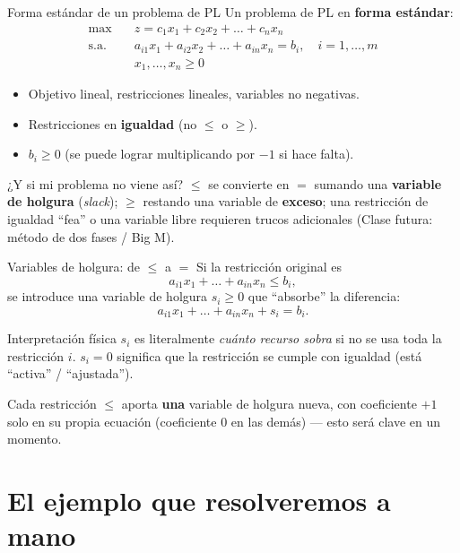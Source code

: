 \documentclass[aspectratio=169]{beamer}
\begin{document}
\begin{frame}{Forma estándar de un problema de PL}
Un problema de PL en \textbf{forma estándar}:
\[
\begin{aligned}
\max \quad & z = c_1 x_1 + c_2 x_2 + \dots + c_n x_n \\
\text{s.a.} \quad & a_{i1}x_1 + a_{i2}x_2 + \dots + a_{in}x_n = b_i, \quad i=1,\dots,m \\
& x_1,\dots,x_n \geq 0
\end{aligned}
\]

\begin{itemize}
\item Objetivo lineal, restricciones lineales, variables no negativas.
\item Restricciones en \textbf{igualdad} (no $\leq$ o $\geq$).
\item $b_i \geq 0$ (se puede lograr multiplicando por $-1$ si hace falta).
\end{itemize}
\par\medskip
\begin{block}{¿Y si mi problema no viene así?}
$\leq$ se convierte en $=$ sumando una \textbf{variable de holgura} (\emph{slack}); $\geq$ restando una variable de \textbf{exceso}; una restricción de igualdad ``fea'' o una variable libre requieren trucos adicionales (Clase futura: método de dos fases / Big M).
\end{block}
\end{frame}

\begin{frame}{Variables de holgura: de $\leq$ a $=$}
Si la restricción original es
\[
a_{i1}x_1 + \dots + a_{in}x_n \leq b_i,
\]
se introduce una variable de holgura $s_i \geq 0$ que ``absorbe'' la diferencia:
\[
a_{i1}x_1 + \dots + a_{in}x_n + s_i = b_i.
\]
\par\medskip
\begin{exampleblock}{Interpretación física}
$s_i$ es literalmente \emph{cuánto recurso sobra} si no se usa toda la restricción $i$. $s_i=0$ significa que la restricción se cumple con igualdad (está ``activa'' / ``ajustada'').
\end{exampleblock}

Cada restricción $\leq$ aporta \textbf{una} variable de holgura nueva, con coeficiente $+1$ solo en su propia ecuación (coeficiente $0$ en las demás) --- esto será clave en un momento.
\end{frame}

\section{El ejemplo que resolveremos a mano}
\end{document}
